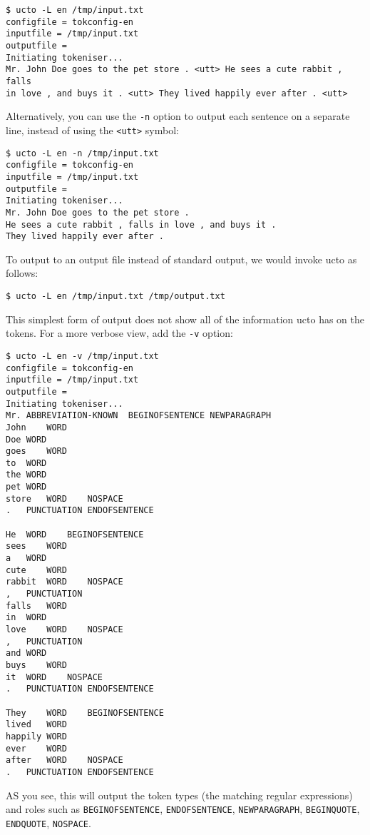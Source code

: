 \documentclass[a4paper,12pt]{report}
\begin{document}
\begin{verbatim}
$ ucto -L en /tmp/input.txt
configfile = tokconfig-en
inputfile = /tmp/input.txt
outputfile = 
Initiating tokeniser...
Mr. John Doe goes to the pet store . <utt> He sees a cute rabbit , falls 
in love , and buys it . <utt> They lived happily ever after . <utt> 
\end{verbatim}

Alternatively, you can use the \texttt{-n} option to output each sentence on a separate line, instead of using the \texttt{<utt>} symbol:

\begin{verbatim}
$ ucto -L en -n /tmp/input.txt
configfile = tokconfig-en
inputfile = /tmp/input.txt
outputfile = 
Initiating tokeniser...
Mr. John Doe goes to the pet store .
He sees a cute rabbit , falls in love , and buys it .
They lived happily ever after .
\end{verbatim}

To output to an output file instead of standard output, we would invoke ucto as follows:

\begin{verbatim}
$ ucto -L en /tmp/input.txt /tmp/output.txt 
\end{verbatim}

This simplest form of output does not show all of the information ucto has on the tokens. For a more verbose view, add the \texttt{-v} option:

\begin{verbatim}
$ ucto -L en -v /tmp/input.txt
configfile = tokconfig-en
inputfile = /tmp/input.txt
outputfile = 
Initiating tokeniser...
Mr.	ABBREVIATION-KNOWN	BEGINOFSENTENCE NEWPARAGRAPH 
John	WORD	
Doe	WORD	
goes	WORD	
to	WORD	
the	WORD	
pet	WORD	
store	WORD	NOSPACE 
.	PUNCTUATION	ENDOFSENTENCE 

He	WORD	BEGINOFSENTENCE 
sees	WORD	
a	WORD	
cute	WORD	
rabbit	WORD	NOSPACE 
,	PUNCTUATION	
falls	WORD	
in	WORD	
love	WORD	NOSPACE 
,	PUNCTUATION	
and	WORD	
buys	WORD	
it	WORD	NOSPACE 
.	PUNCTUATION	ENDOFSENTENCE 

They	WORD	BEGINOFSENTENCE 
lived	WORD	
happily	WORD	
ever	WORD	
after	WORD	NOSPACE 
.	PUNCTUATION	ENDOFSENTENCE 
\end{verbatim}

AS you see, this will output the token types (the matching regular expressions) and roles such as \texttt{BEGINOFSENTENCE}, \texttt{ENDOFSENTENCE}, \texttt{NEWPARAGRAPH}, \texttt{BEGINQUOTE}, \texttt{ENDQUOTE}, \texttt{NOSPACE}.
\end{document}
